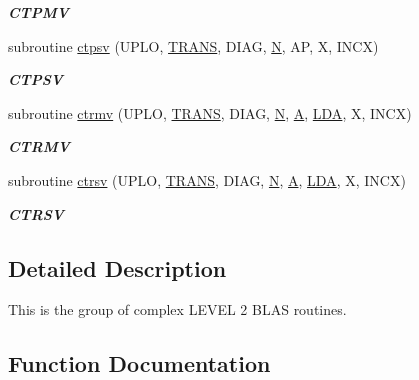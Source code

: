 \begin{DoxyCompactItemize}
\begin{DoxyCompactList}\small\item\em {\bfseries C\+T\+P\+M\+V} \end{DoxyCompactList}\item 
subroutine \hyperlink{group__complex__blas__level2_ga1afdec04246cf2d0cb650ec237296ef3}{ctpsv} (U\+P\+L\+O, \hyperlink{superlu__enum__consts_8h_a0c4e17b2d5cea33f9991ccc6a6678d62a1f61e3015bfe0f0c2c3fda4c5a0cdf58}{T\+R\+A\+N\+S}, D\+I\+A\+G, \hyperlink{polmisc_8c_a0240ac851181b84ac374872dc5434ee4}{N}, A\+P, X, I\+N\+C\+X)
\begin{DoxyCompactList}\small\item\em {\bfseries C\+T\+P\+S\+V} \end{DoxyCompactList}\item 
subroutine \hyperlink{group__complex__blas__level2_ga62930e76219d094e424db1712a5356cb}{ctrmv} (U\+P\+L\+O, \hyperlink{superlu__enum__consts_8h_a0c4e17b2d5cea33f9991ccc6a6678d62a1f61e3015bfe0f0c2c3fda4c5a0cdf58}{T\+R\+A\+N\+S}, D\+I\+A\+G, \hyperlink{polmisc_8c_a0240ac851181b84ac374872dc5434ee4}{N}, \hyperlink{classA}{A}, \hyperlink{example__user_8c_ae946da542ce0db94dced19b2ecefd1aa}{L\+D\+A}, X, I\+N\+C\+X)
\begin{DoxyCompactList}\small\item\em {\bfseries C\+T\+R\+M\+V} \end{DoxyCompactList}\item 
subroutine \hyperlink{group__complex__blas__level2_ga38ae7f5a40e16fd315011faddf4412cc}{ctrsv} (U\+P\+L\+O, \hyperlink{superlu__enum__consts_8h_a0c4e17b2d5cea33f9991ccc6a6678d62a1f61e3015bfe0f0c2c3fda4c5a0cdf58}{T\+R\+A\+N\+S}, D\+I\+A\+G, \hyperlink{polmisc_8c_a0240ac851181b84ac374872dc5434ee4}{N}, \hyperlink{classA}{A}, \hyperlink{example__user_8c_ae946da542ce0db94dced19b2ecefd1aa}{L\+D\+A}, X, I\+N\+C\+X)
\begin{DoxyCompactList}\small\item\em {\bfseries C\+T\+R\+S\+V} \end{DoxyCompactList}\end{DoxyCompactItemize}


\subsection{Detailed Description}
This is the group of complex L\+E\+V\+E\+L 2 B\+L\+A\+S routines. 

\subsection{Function Documentation}
\hypertarget{group__complex__blas__level2_ga50fe7a70e7ae8f9ede50acd6747510d7}{}
